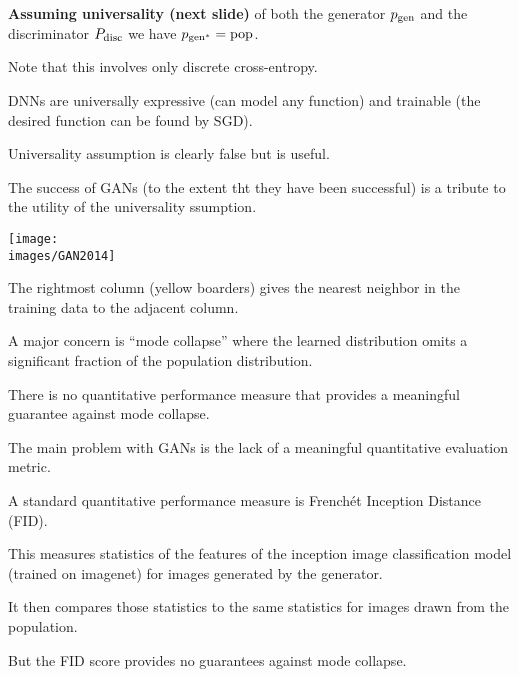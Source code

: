 {\vfill
{\bf Assuming universality (next slide)} of both the generator $p_{\mathrm{gen}}$ and the discriminator $P_{\mathrm{disc}}$ we have {\color{red} $p_{\mathrm{gen}^*} = \mathrm{pop}$}.

\vfill
Note that this involves only discrete cross-entropy.



DNNs are universally expressive (can model any function) and trainable (the desired function can be found by SGD).

\vfill
Universality assumption is clearly false but is useful.

\vfill
The success of GANs (to the extent tht they have been successful) is a tribute to the utility of the universality ssumption.


\centerline{\texttt{[image: \\images/GAN2014]}}
The rightmost column (yellow boarders) gives the nearest neighbor in the training data to the adjacent column.


A major concern is ``mode collapse'' where the learned distribution omits a significant fraction of the population distribution.

\vfill
There is no quantitative performance measure that provides a meaningful guarantee against mode collapse.


The main problem with GANs is the lack of a meaningful quantitative evaluation metric.

\vfill
A standard quantitative performance measure is French\'{e}t Inception Distance (FID).

\vfill
This measures statistics of the features
of the inception image classification model (trained on imagenet) for images generated by the generator.

\vfill
It then compares those statistics
to the same statistics for images drawn from the population.

\vfill
But the FID score provides no guarantees against mode collapse.


}

